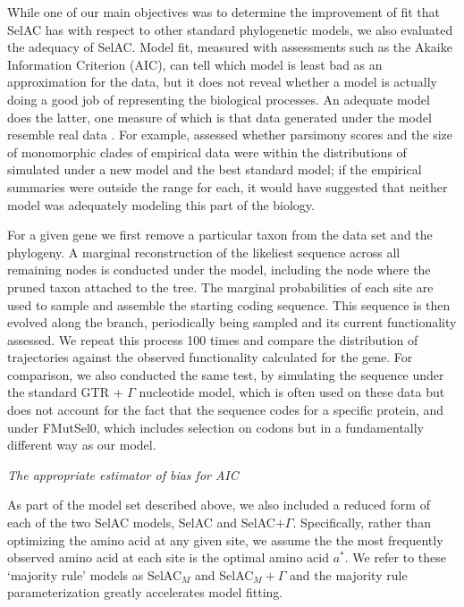 \documentclass[12pt,letterpaper]{article}
\renewcommand{\subsection}[1]{%
\bigskip
\begin{center}
\begin{large}
\normalfont\itshape #1
\end{large}
\end{center}}
\newcommand{\selac}{SelAC\xspace}
\newcommand{\selacplusgamma}{SelAC$+\Gamma$\xspace}
\newcommand{\selacmaj}{SelAC$_{M}$\xspace}
\newcommand{\selacmajplusgamma}{SelAC$_{M}+\Gamma$\xspace}
\newcommand{\aopt}{\ensuremath{a^*}\xspace}
\begin{document}
While one of our main objectives was to determine the improvement of fit that \selac has with respect to other standard phylogenetic models, we also evaluated the adequacy of \selac.
Model fit, measured with assessments such as the Akaike Information Criterion (AIC), can tell which model is least bad as an approximation for the data, but it does not reveal whether a model is actually doing a good job of representing the biological processes.
An adequate model does the latter, one measure of which is that data generated under the model resemble real data \citep{goldman1993statistical}.
For example, \citet{BeaulieuEtAl2013} assessed whether parsimony scores and the size of monomorphic clades of empirical data were within the distributions of simulated under a new model and the best standard model; if the empirical summaries were outside the range for each, it would have suggested that neither model was adequately modeling this part of the biology.

For a given gene we first remove a particular taxon from the data set and the phylogeny.
A marginal reconstruction of the likeliest sequence across all remaining nodes is conducted under the model, including the node where the pruned taxon attached to the tree.
The marginal probabilities of each site are used to sample and assemble the starting coding sequence.
This sequence is then evolved along the branch, periodically being sampled and its current functionality assessed.
We repeat this process 100 times and compare the distribution of trajectories against the observed functionality calculated for the gene.
For comparison, we also conducted the same test, by simulating the sequence under the standard GTR + $\Gamma$ nucleotide model, which is often used on these data but does not account for the fact that the sequence codes for a specific protein, and under FMutSel0, which includes selection on codons but in a fundamentally different way as our model.

\subsection{The appropriate estimator of bias for AIC}
As part of the model set described above, we also included a reduced form of each of the two \selac models, \selac and \selacplusgamma.
Specifically, rather than optimizing the amino acid at any given site, we assume the  the most frequently observed amino acid at each site is the optimal amino acid \aopt.
We refer to these `majority rule' models as \selacmaj and \selacmajplusgamma and the majority rule parameterization greatly accelerates model fitting.
\end{document}
